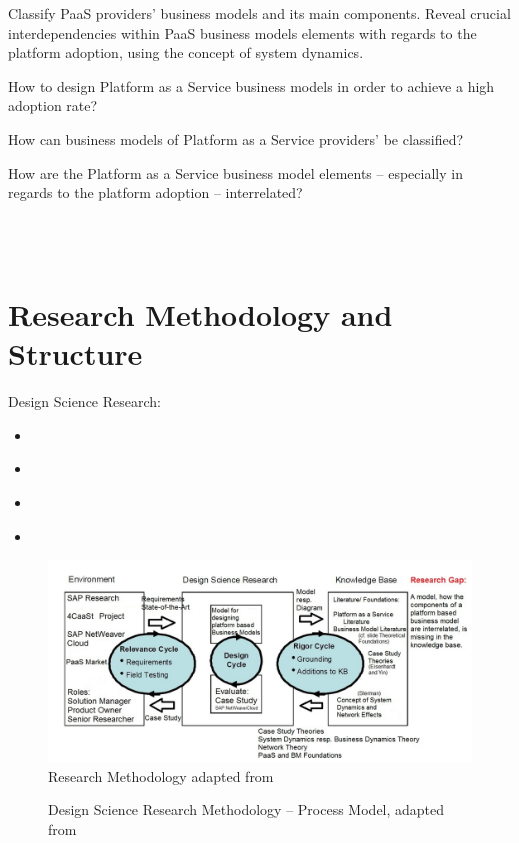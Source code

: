 Classify PaaS providers' business models and its main components. Reveal crucial interdependencies within PaaS business models elements with regards to the platform adoption, using the concept of system dynamics.

\begin{MRQ}\label{mrq}
How to design Platform as a Service business models in order to achieve a high adoption rate?
\end{MRQ}

\begin{SRQ}\label{srq1}
How can business models of Platform as a Service providers' be classified?
\end{SRQ}

\begin{SRQ}\label{srq2}
How are the Platform as a Service business model elements -- especially in regards to the platform adoption -- interrelated?
\end{SRQ}

\\
\\
	
\section{Research Methodology and Structure}\label{ch:intro:met}

Design Science Research:
\begin{itemize}
	\item \citet{March1995}
	\item \citet{Hevner2004}
	\item \citet{Hevner2007}
	\item \citet{Peffers2007}
\end{itemize}

\begin{figure}[htb]
	\centering
	\includegraphics[width=\textwidth]{gfx/researchMethodology}
	\caption[Research Methodology]{Research Methodology adapted from \citet{Hevner2007}}
	\label{fig:rm}
\end{figure}

\begin{figure}[tb]
	\centering
	
	\caption[Design Science Research Methodology -- Process Model]{Design Science Research Methodology -- Process Model, adapted from \citet{Peffers2007}}
	\label{fig:dsrm}
\end{figure}

